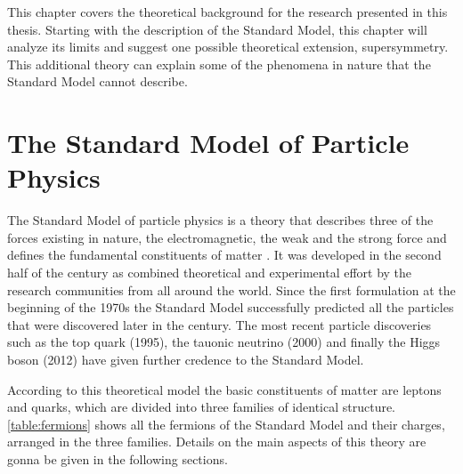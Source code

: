 
This chapter covers the theoretical background for the research presented in this thesis. Starting with the description of the Standard Model, this chapter will analyze its limits and suggest one possible theoretical extension, supersymmetry. This additional theory can explain some of the phenomena in nature that the Standard Model cannot describe.

\section{The Standard Model of Particle Physics}

The Standard Model of particle physics is a theory that describes three of the forces existing in nature, the electromagnetic, the weak and the strong force and defines the fundamental constituents of matter \cite{Spiesberger:2000ks}. It was developed in the second half of the century as combined theoretical and experimental effort by the research communities from all around the world. Since the first formulation at the beginning of the 1970s the Standard Model successfully predicted all the particles that were discovered later in the century. The most recent particle discoveries such as the top quark (1995), the tauonic neutrino (2000) and finally the Higgs boson (2012) have given further credence to the Standard Model. 

According to this theoretical model the basic constituents of matter are leptons and quarks, which are divided into three families of identical structure. \autoref{table:fermions} shows all the fermions of the Standard Model and their charges, arranged in the three families. Details on the main aspects of this theory are gonna be given in the following sections.

